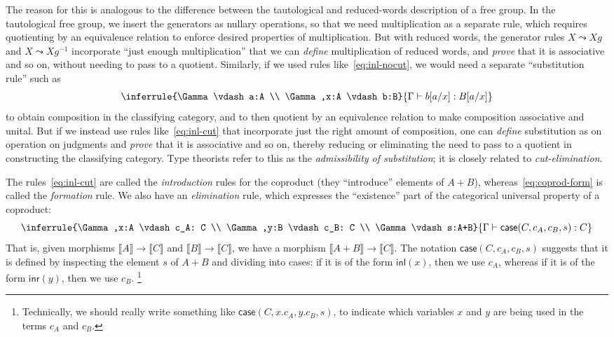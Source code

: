 \documentclass[12pt]{article}
\def\m#1{\llbracket#1\rrbracket}
\def\inl{\mathsf{inl}}
\def\inr{\mathsf{inr}}
\def\case{\mathsf{case}}
\def\types{\vdash}
\numberwithin{equation}{section}
\begin{document}
The reason for this is analogous to the difference between the tautological and reduced-words description of a free group.
In the tautological free group, we insert the generators as nullary operations, so that we need multiplication as a separate rule, which requires quotienting by an equivalence relation to enforce desired properties of multiplication.
But with reduced words, the generator rules $X \leadsto Xg$ and $X \leadsto Xg^{-1}$ incorporate ``just enough multiplication'' that we can \emph{define} multiplication of reduced words, and \emph{prove} that it is associative and so on, without needing to pass to a quotient.
Similarly, if we used rules like~\eqref{eq:inl-nocut}, we would need a separate ``substitution rule'' such as
\[ \inferrule{\Gamma \types a:A \\ \Gamma,x:A \types b:B}{\Gamma \types b[a/x]:B[a/x]} \]
to obtain composition in the classifying category, and to then quotient by an equivalence relation to make composition associative and unital.
But if we instead use rules like~\eqref{eq:inl-cut} that incorporate just the right amount of composition, one can \emph{define} substitution as on operation on judgments and \emph{prove} that it is associative and so on, thereby reducing or eliminating the need to pass to a quotient in constructing the classifying category.
Type theorists refer to this as the \emph{admissibility of substitution}; it is closely related to \emph{cut-elimination}.

The rules~\eqref{eq:inl-cut} are called the \emph{introduction} rules for the coproduct (they ``introduce'' elements of $A+B$), whereas~\eqref{eq:coprod-form} is called the \emph{formation} rule.
We also have an \emph{elimination} rule, which expresses the ``existence'' part of the categorical universal property of a coproduct:
\begin{equation}
  \inferrule{\Gamma,x:A \types c_A: C \\ \Gamma,y:B \types c_B: C \\ \Gamma \types s:A+B}
{\Gamma \types \case(C,c_A,c_B,s) : C}\label{eq:coprod-nondepelim}
\end{equation}
That is, given morphisms $\m A \to \m C$ and $\m B \to \m C$, we have a morphism $\m {A+B} \to \m C$.
The notation $\case(C,c_A,c_B,s)$ suggests that it is defined by inspecting the element $s$ of $A+B$ and dividing into cases: if it is of the form $\inl(x)$, then we use $c_A$, whereas if it is of the form $\inr(y)$, then we use $c_B$.%
\footnote{Technically, we should really write something like $\case(C,x.c_A,y.c_B,s)$, to indicate which variables $x$ and $y$ are being used in the terms $c_A$ and $c_B$.}
\end{document}
